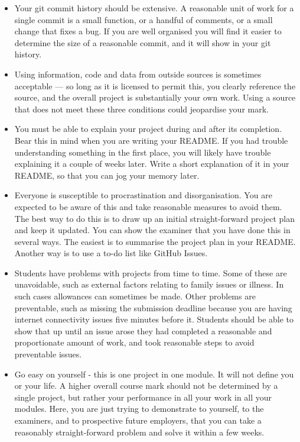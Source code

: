 \documentclass[12pt, a4paper, hidelinks]{scrartcl}
\begin{document}
  \begin{itemize}
    \item
      Your git commit history should be extensive.
      A reasonable unit of work for a single commit is a small function, or a handful of comments, or a small change that fixes a bug.
      If you are well organised you will find it easier to determine the size of a reasonable commit, and it will show in your git history.
    \item
      Using information, code and data from outside sources is sometimes acceptable --- so long as it is licensed to permit this, you clearly reference the source, and the overall project is substantially your own work.
      Using a source that does not meet these three conditions could jeopardise your mark.
    \item
      You must be able to explain your project during and after its completion.
      Bear this in mind when you are writing your README.
      If you had trouble understanding something in the first place, you will likely have trouble explaining it a couple of weeks later.
      Write a short explanation of it in your README, so that you can jog your memory later.
    \item
      Everyone is susceptible to procrastination and disorganisation.
      You are expected to be aware of this and take reasonable measures to avoid them.
      The best way to do this is to draw up an initial straight-forward project plan and keep it updated.
      You can show the examiner that you have done this in several ways.
      The easiest is to summarise the project plan in your README.
      Another way is to use a to-do list like GitHub Issues.
    \item
      Students have problems with projects from time to time.
      Some of these are unavoidable, such as external factors relating to family issues or illness.
      In such cases allowances can sometimes be made.
      Other problems are preventable, such as missing the submission deadline because you are having internet connectivity issues five minutes before it.
      Students should be able to show that up until an issue arose they had completed a reasonable and proportionate amount of work, and took reasonable steps to avoid preventable issues.
    \item
      Go easy on yourself - this is one project in one module.
      It will not define you or your life.
      A higher overall course mark should not be determined by a single project, but rather your performance in all your work in all your modules.
      Here, you are just trying to demonstrate to yourself, to the examiners, and to prospective future employers, that you can take a reasonably straight-forward problem and solve it within a few weeks.
  \end{itemize}


  
  
\end{document}
